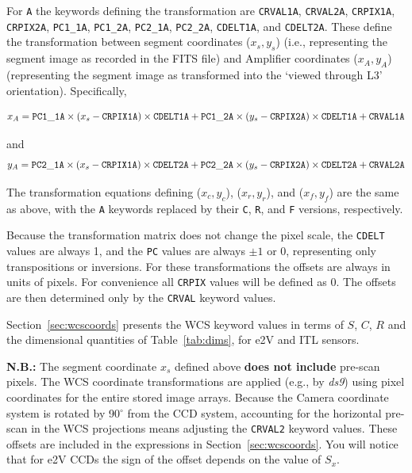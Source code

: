 \documentclass{article}[12pt]
\begin{document}
{For {\tt A} the keywords defining the transformation are {\tt CRVAL1A}, {\tt CRVAL2A}, {\tt CRPIX1A}, {\tt CRPIX2A}, {\tt PC1\_1A}, {\tt PC1\_2A}, {\tt PC2\_1A}, {\tt PC2\_2A}, {\tt CDELT1A}, and {\tt CDELT2A}.  These define the transformation between segment coordinates ($x_s, y_s$) (i.e., representing the segment image as recorded in the FITS file) and Amplifier coordinates ($x_A, y_A$) (representing the segment image as transformed into the `viewed through L3' orientation).  Specifically,

\begin{equation}
x_A = {\tt PC1\_1A} \times (x_s -{\tt CRPIX1A}) \times {\tt CDELT1A} + {\tt PC1\_2A} \times (y_s - {\tt CRPIX2A}) \times {\tt CDELT1A} + {\tt CRVAL1A}
\end{equation}

and
\begin{equation}
y_A = {\tt PC2\_1A} \times (x_s - {\tt CRPIX1A}) \times {\tt CDELT2A} + {\tt PC2\_2A} \times (y_s - {\tt CRPIX2A}) \times {\tt CDELT2A} + {\tt CRVAL2A}
\end{equation}

The transformation equations defining ($x_c, y_c$), ($x_r, y_r$), and ($x_f, y_f$) are the same as above, with the {\tt A} keywords replaced by their {\tt C}, {\tt R}, and {\tt F} versions, respectively.

Because the transformation matrix does not change the pixel scale, the {\tt CDELT} values are always 1, and the {\tt PC} values are always $\pm1$ or 0, representing only transpositions or inversions.  For these transformations the offsets are always in units of pixels.  For convenience all {\tt CRPIX} values will be defined as 0.  The offsets are then determined only by the {\tt CRVAL} keyword values.

Section~\ref{sec:wcscoords} presents the WCS keyword values in terms of $S$, $C$, $R$ and the dimensional quantities of Table~\ref{tab:dims}, for e2V and ITL sensors.  

{\bf N.B.:} The segment coordinate $x_s$ defined above {\bf does not include} pre-scan pixels.  The WCS coordinate transformations are applied (e.g., by {\it ds9}) using pixel coordinates for the entire stored image arrays.  Because the Camera coordinate system is rotated by 90$^\circ$ from the CCD system, accounting for the horizontal pre-scan in the WCS projections means adjusting the {\tt CRVAL2} keyword values.  These offsets are included in the expressions in Section~\ref{sec:wcscoords}.  You will notice that for e2V CCDs the sign of the offset depends on the value of $S_x$.

}
\end{document}
